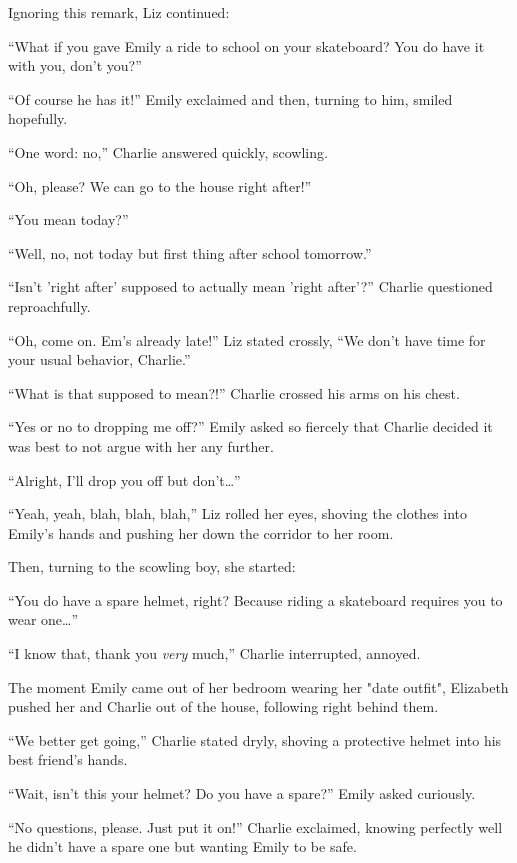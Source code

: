 Ignoring this remark, Liz continued:

“What if you gave Emily a ride to school on your skateboard? You do have it with you, don't you?”

“Of course he has it!” Emily exclaimed and then, turning to him, smiled hopefully.

“One word: no,” Charlie answered quickly, scowling.

“Oh, please? We can go to the house right after!”

“You mean today?”

“Well, no, not today but first thing after school tomorrow.”

“Isn't 'right after' supposed to actually mean 'right after'?” Charlie questioned reproachfully.

“Oh, come on. Em's already late!” Liz stated crossly, “We don't have time for your usual behavior, Charlie.”

“What is that supposed to mean?!” Charlie crossed his arms on his chest.

“Yes or no to dropping me off?” Emily asked so fiercely that Charlie decided it was best to not argue with her any further.

“Alright, I'll drop you off but don't…”

“Yeah, yeah, blah, blah, blah,” Liz rolled her eyes, shoving the clothes into Emily's hands and pushing her down the corridor to her room.

Then, turning to the scowling boy, she started:

“You do have a spare helmet, right? Because riding a skateboard requires you to wear one…”

“I know that, thank you \textit{very} much,” Charlie interrupted, annoyed.

The moment Emily came out of her bedroom wearing her "date outfit", Elizabeth pushed her and Charlie out of the house, following right behind them.

“We better get going,” Charlie stated dryly, shoving a protective helmet into his best friend's hands.

“Wait, isn't this your helmet? Do you have a spare?” Emily asked curiously.

“No questions, please. Just put it on!” Charlie exclaimed, knowing perfectly well he didn't have a spare one but wanting Emily to be safe.